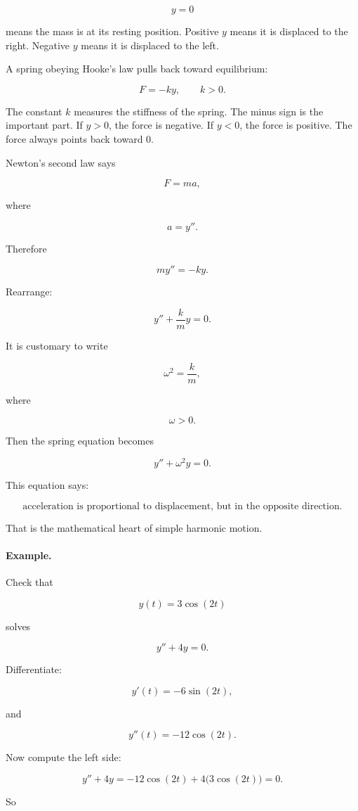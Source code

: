 \[
y=0
\]

means the mass is at its resting position.  Positive \(y\) means it is displaced to the
right.  Negative \(y\) means it is displaced to the left.

A spring obeying Hooke's law pulls back toward equilibrium:

\[
F=-ky,
\qquad k>0.
\]

The constant \(k\) measures the stiffness of the spring.  The minus sign is the important
part.  If \(y>0\), the force is negative.  If \(y<0\), the force is positive.  The force always
points back toward \(0\).

Newton's second law says

\[
F=ma,
\]

where

\[
a=y''.
\]

Therefore

\[
my''=-ky.
\]

Rearrange:

\[
y''+\frac{k}{m}y=0.
\]

It is customary to write

\[
\omega^2=\frac{k}{m},
\]

where

\[
\omega>0.
\]

Then the spring equation becomes

\[
\boxed{
y''+\omega^2 y=0.
}
\]

This equation says:

\[
\boxed{
\text{acceleration is proportional to displacement, but in the opposite direction.}
}
\]

That is the mathematical heart of simple harmonic motion.

\paragraph{Example.}
Check that

\[
y(t)=3\cos(2t)
\]

solves

\[
y''+4y=0.
\]

Differentiate:

\[
y'(t)=-6\sin(2t),
\]

and

\[
y''(t)=-12\cos(2t).
\]

Now compute the left side:

\[
y''+4y
=
-12\cos(2t)+4\bigl(3\cos(2t)\bigr)
=
0.
\]

So

